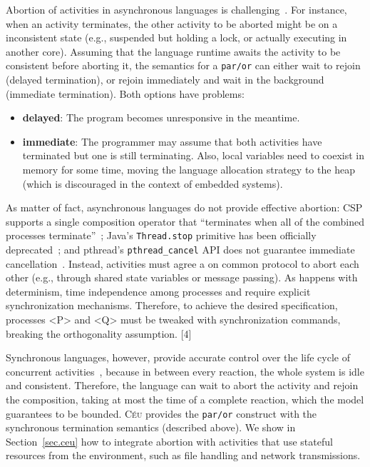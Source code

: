 \documentclass{acm_proc_article-sp}
\newcommand{\CEU}{\textsc{C\'{e}u}\xspace}
\newcommand{\code}[1] {{\small{\texttt{#1}}}}
\newcommand{\1}{\;}
\newcommand{\2}{\;\;}
\newcommand{\3}{\;\;\;}
\newcommand{\5}{\;\;\;\;\;}
\begin{document}
Abortion of activities in asynchronous languages is 
challenging~\cite{esterel.preemption}.
For instance, when an activity terminates, the other activity to be aborted 
might be on a inconsistent state (e.g., suspended but holding a lock, or 
actually executing in another core).
%
Assuming that the language runtime awaits the activity to be consistent before 
aborting it, the semantics for a \code{par/or} can either wait to rejoin 
(delayed termination), or rejoin immediately and wait in the background 
(immediate termination).
Both options have problems:
\begin{itemize}
\item \textbf{delayed}:
    The program becomes unresponsive in the meantime.
\item \textbf{immediate}:
    The programmer may assume that both activities have terminated but one is 
still terminating.
    Also, local variables need to coexist in memory for some time, moving the 
    language allocation strategy to the heap (which is discouraged in the 
context of embedded systems).
\end{itemize}

As matter of fact, asynchronous languages do not provide effective abortion:
CSP supports a single composition operator that ``terminates when all of the 
combined processes terminate''~\cite{async.csp};
Java's \code{Thread.stop} primitive has been officially 
deprecated~\cite{sync_async.threadstop};
and pthread's \code{pthread\_cancel} API does not guarantee immediate 
cancellation~\cite{snync_async.pthreadstop}.
%
Instead, activities must agree a on common protocol to abort each other (e.g., 
through shared state variables or message passing).
%
As happens with determinism, time independence among processes and
require explicit synchronization mechanisms. Therefore, to
achieve the desired specification, processes <P> and <Q> must
be tweaked with synchronization commands, breaking the
orthogonality assumption. [4]

Synchronous languages, however, provide accurate control over the life cycle of 
concurrent activities~\cite{esterel.preemption}, because in between every 
reaction, the whole system is idle and consistent.
%
Therefore, the language can wait to abort the activity and rejoin the 
composition, taking at most the time of a complete reaction, which the model 
guarantees to be bounded.
%
\CEU provides the \code{par/or} construct with the synchronous termination 
semantics (described above).
%
We show in Section~\ref{sec.ceu} how to integrate abortion with activities that 
use stateful resources from the environment, such as file handling and network 
transmissions.
\end{document}

